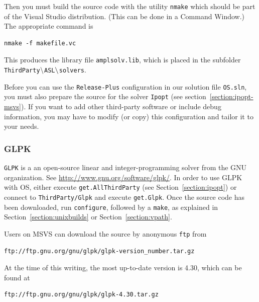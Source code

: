 \documentclass[11pt]{article}
\renewcommand{\_}{{\char"5F}}
\renewcommand{\{}{{\char"7B}}
\renewcommand{\}}{{\char"7D}}
\renewcommand{\^}{{\char"0D}}
\renewcommand{\'}{{\char"0D}}
\newif\ifipopt  \ipopttrue      %
\begin{document}
Then you must build the source code with the utility {\tt nmake}
which should be part of the Visual Studio distribution. (This can be done in a Command Window.)
The appropriate command is
\begin{verbatim}
nmake -f makefile.vc
\end{verbatim}
This produces the library file {\tt amplsolv.lib}, which is placed in the subfolder
{\tt ThirdParty$\tt\backslash$ASL$\tt\backslash$solvers}.

\ifipopt
Before you can use the {\tt Release-Plus} configuration in our solution file {\tt OS.sln}, 
you must also prepare the source for the solver {\tt Ipopt}
(see section~\ref{section:ipopt-msvs}). If you want to add other third-party software or include debug information, 
you may have to modify (or copy) this configuration and tailor it to your needs.
\else
Now you are ready to use MSVS. Both the {\tt Debug} and {\tt Release} configurations
contain two projects, {\tt libOSnl2OSiL} and {\tt OSAmplClient}, which use the ASL library
and are normally deactivated. Activate these projects
in the Configuration Manager\index{Configuration Manager} (available from the Build menu), then select Build.
\fi
{}

\subsubsection{GLPK}

%
{\tt GLPK} is a an open-source linear and integer-programming solver from the GNU organization. 
See \url{http://www.gnu.org/software/glpk/}.  In order to use GLPK with OS, either execute {\tt get.AllThirdParty}
(see Section~\ref{section:ipopt}) 
or connect to {\tt ThirdParty/Glpk} and execute {\tt get.Glpk}. Once the source code has been downloaded, 
run {\tt configure}, followed by a {\tt make}, as explained in Section~\ref{section:unixbuilds} or Section~\ref{section:vpath}.

Users on MSVS can download the source by anonymous {\tt ftp} from
\begin{verbatim}
ftp://ftp.gnu.org/gnu/glpk/glpk-version_number.tar.gz
\end{verbatim}

At the time of this writing, the most up-to-date version is 4.30, which can be found at
\begin{verbatim}
ftp://ftp.gnu.org/gnu/glpk/glpk-4.30.tar.gz
\end{verbatim}
\end{document}
